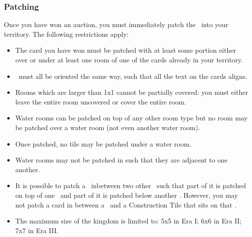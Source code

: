 \documentclass[10pt,twocolumn]{article}
\begin{document}
\subsubsection{Patching \landcards}
Once you have won an auction, you must immediately patch the \landcard\ into your territory. The following restrictions apply:
\begin{itemize}
\item The card you have won must be patched with at least some portion either over or under at least one room of one of the cards already in your territory.
\item \landcards\ must all be oriented the same way, such that all the text on the cards aligns.
\item Rooms which are larger than 1x1 cannot be partially covered: you must either leave the entire room uncovered or cover the entire room.
\end{itemize}
\begin{itemize}
\item Water rooms can be patched on top of any other room type but no room may be patched over a water room (not even another water room).
\end{itemize}
\begin{itemize}
\item Once patched, no tile may be patched under a water room.
\item Water rooms may not be patched in such that they are adjacent to one another.
\item It is possible to patch a \landcard\ inbetween two other \landcards\ such that part of it is patched on top of one \landcard\ and part of it is patched below another \landcard. However, you may not patch a card in between a \landcard\ and a Construction Tile that sits on that \landcard.
\end{itemize}
\begin{itemize}
\item The maximum size of the kingdom is limited to: 5x5 in Era I; 6x6 in Era II; 7x7 in Era III.
\end{itemize}
\end{document}
